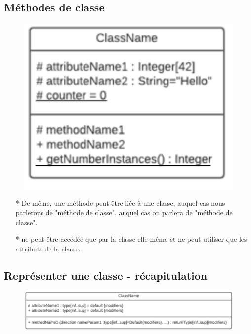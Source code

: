 \documentclass[12pt]{article}
\begin{document}
\subsection{Méthodes de classe}
\newpage
\begin{figure}[!hbtp]
	\centering
	\includegraphics[scale=0.75]{Capture8.PNG}
\end{figure}
\begin{itemize}
	\item[* ] De même, une méthode peut être liée à une classe, auquel cas nous parlerons de "méthode de classe".
	auquel cas on parlera de "méthode de classe".
	\item[* ] ne peut être accédée que par la classe elle-même
	et ne peut utiliser que les attributs de la classe.
\end{itemize}
\subsection{Représenter une classe - récapitulation}
\begin{figure}[!hbtp]
	\centering
	\includegraphics[scale=0.75]{Capture9.PNG}
\end{figure}
\end{document}
